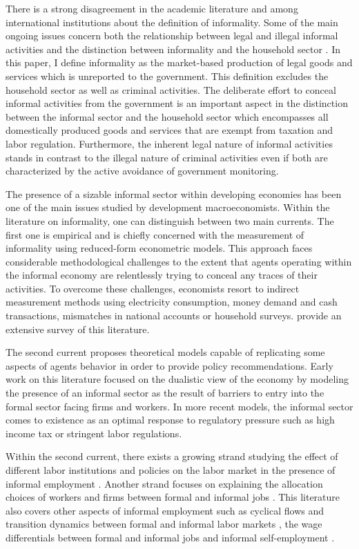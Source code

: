 \documentclass[12pt,a4paper,titlepage]{article}
\begin{document}
There is a strong disagreement in the academic literature and among international institutions about the definition of informality. Some of the main ongoing issues concern both the relationship between legal and illegal informal activities and the distinction between informality and the household sector \citep{ILO2013}. In this paper, I define informality as the market-based production of legal goods and services which is unreported to the government. This definition excludes the household sector as well as criminal activities. The deliberate effort to conceal informal activities from the government is an important aspect in the distinction between the informal sector and the household sector which encompasses all domestically produced goods and services that are exempt from taxation and labor regulation. Furthermore, the inherent legal nature of informal activities stands in contrast to the illegal nature of criminal activities even if both are characterized by the active avoidance of government monitoring.

The presence of a sizable informal sector within developing economies has been one of the main issues studied by development macroeconomists. Within the literature on informality, one can distinguish between two main currents. The first one is empirical and is chiefly concerned with the measurement of informality using reduced-form econometric models. This approach faces considerable methodological challenges to the extent that agents operating within the informal economy are relentlessly trying to conceal any traces of their activities. To overcome these challenges, economists resort to indirect measurement methods using electricity consumption, money demand and cash transactions, mismatches in national accounts or household surveys. \cite{Schneider2011} provide an extensive survey of this literature.

The second current proposes theoretical models capable of replicating some aspects of agents behavior in order to provide policy recommendations. Early work on this literature focused on the dualistic view of the economy by modeling the presence of an informal sector as the result of barriers to entry into the formal sector facing firms and workers. In more recent models, the informal sector comes to existence as an optimal response to regulatory pressure such as high income tax or stringent labor regulations.

Within the second current, there exists a growing strand studying the effect of different labor institutions and policies on the labor market in the presence of informal employment \citep{Fugazza2004, Zenou2008, Albrecht2009, Ulyssea2010, Bosch2012, Bosch2014, Charlot2015, Meghir2015}. Another strand focuses on explaining the allocation choices of workers and firms between formal and informal jobs \citep{Garcia2013, Almeida2012, Boeri2005}. This literature also covers other aspects of informal employment such as cyclical flows and transition dynamics between formal and informal labor markets \citep{Bosch2008, Bosch2010}, the wage differentials between formal and informal jobs \citep{ElBadaoui2010} and informal self-employment \citep{Narita2014, Albrecht2009, Satchi2009}.
\end{document}

